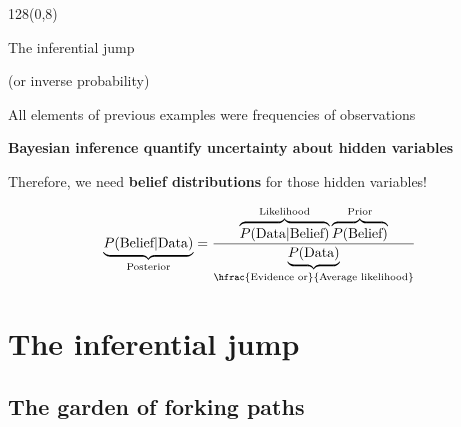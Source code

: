 \documentclass[shownotes]{beamer}
\begin{document}
\begin{frame}
\begin{textblock}{128}(0,8)
\begin{center}
 \Large The inferential jump
 
 \normalsize (or inverse probability)
\end{center}
\end{textblock}
\vspace{0.9cm}

 \begin{framed}
 \centering
  All elements of previous examples were frequencies of observations
  
 \textbf{Bayesian inference quantify uncertainty about hidden variables}

 Therefore, we need \textbf{belief distributions} for those hidden variables!
 \end{framed} 

 \pause 

 \begin{equation}
  \underbrace{P(\text{Belief}|\text{Data})}_{\text{\scriptsize Posterior}} = \frac{\overbrace{P(\text{Data}|\text{Belief})}^{\text{\scriptsize Likelihood}} \overbrace{P(\text{Belief})}^{\text{\scriptsize Prior}} }{\underbrace{P(\text{Data})}_{\hfrac{\text{\scriptsize Evidence or}}{\text{\scriptsize Average likelihood}}}}
 \end{equation}

 \pause \vspace{0.3cm}
 
 
 
\end{frame}

\section{The inferential jump}

\subsection{The garden of forking paths}
\end{document}
